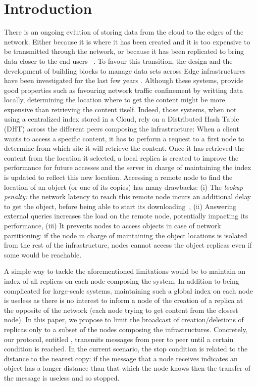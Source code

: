 
\section{Introduction}

There is an ongoing evlution of storing data from the cloud to the
edges of the network. Either because it is where it has been created
and it is too expensive to be transmitted through the network, or
because it has been replicated to bring data closer to the end users
~\cite{shi2016edge, fogstore, foggy_cache, cachier}.
%
To favour this transition, the design and the development of building
blocks to manage data sets across Edge infrastructures have been
investigated for the last few years \cite{confais2017performance,
  confais2017object, hasenburg2020towards}.  Although these systems,
provide good properties such as favouring network traffic confinement
by writting data locally, determining the location where to get the
content might be more expensive than retrieving the content itself.
%
Indeed, those systems, when not using a centralized index stored in a
Cloud, rely on a Distributed Hash Table (DHT) across the different
peers composing the infrastructure: When a client wants to access a
specific content, it has to perform a request to a first node to
determine from which site it will retrieve the content. Once it has
retrieved the content from the location it selected, a local replica
is created to improve the performance for future accesses and the
server in charge of maintaining the index is updated to reflect this
new location.
%
Accessing a remote node to find the location of an object (or one of
its copies) has many drawbacks: (i) The \textit{lookup penalty:} the
network latency to reach this remote node incurs an additional delay
to get the object, before being able to start its
downloading~\cite{asrese2019measuring, doan2019tracing}, (ii)
Answering external queries increases the load on the remote node,
potentially impacting its performance, (iii) It prevents nodes to
access objects in case of network partitioning: if the node in charge
of maintaining the object locations is isolated from the rest of the
infrastructure, nodes cannot access the object replicas even if some
would be reachable.

A simple way to tackle the aforementioned limitations would be to
maintain an index of all replicas on each node composing the
system. In addition to being complicated  for large-scale
systems, maintaining such a global index on each node is useless as there
is no interest to inform a node of the creation of a replica at the
opposite of the network (each node trying to get content from the closest node).
%
In this paper, we propose to limit the broadcast of creation/deletions
of replicas only to a subset of the nodes composing the
infrastructures.  Concretely, our protocol, entitled \NAME, transmits
messages from peer to peer until a certain condition is reached. In
the current scenario, the stop condition is related to the distance to
the nearest copy: if the message that a node receives indicates an
object has a longer distance than that which the node knows then the
transfer of the message is useless and so stopped.


